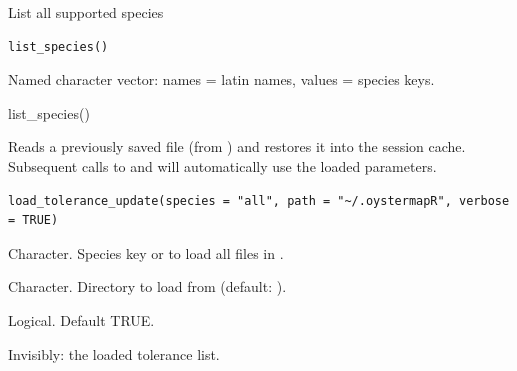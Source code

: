 \documentclass[a4paper]{book}
\begin{document}
%
\begin{Description}
List all supported species
\end{Description}
%
\begin{Usage}
\begin{verbatim}
list_species()
\end{verbatim}
\end{Usage}
%
\begin{Value}
Named character vector: names = latin names, values = species keys.
\end{Value}
%
\begin{Examples}
\begin{ExampleCode}
list_species()
\end{ExampleCode}
\end{Examples}
%
\begin{Description}
Reads a previously saved  file (from ) and
restores it into the session cache. Subsequent calls to 
and  will automatically use the loaded parameters.
\end{Description}
%
\begin{Usage}
\begin{verbatim}
load_tolerance_update(species = "all", path = "~/.oystermapR", verbose = TRUE)
\end{verbatim}
\end{Usage}
%
\begin{Arguments}
\begin{ldescription}
\item[\code{species}] Character. Species key or  to load all  files
in .

\item[\code{path}] Character. Directory to load from (default: ).

\item[\code{verbose}] Logical. Default TRUE.
\end{ldescription}
\end{Arguments}
%
\begin{Value}
Invisibly: the loaded tolerance list.
\end{Value}
\end{document}
